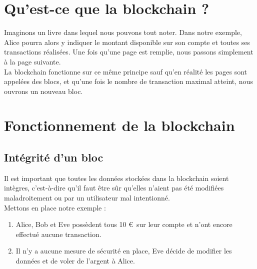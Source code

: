 \documentclass[12pt, a4paper, oneside]{book}
\begin{document}
    \section{Qu'est-ce que la blockchain ?}
    Imaginons un livre dans lequel nous pouvons tout noter. Dans notre exemple, Alice pourra alors y indiquer le montant disponible sur son compte et toutes ses transactions réalisées. Une fois qu’une page est remplie, nous passons simplement à la page suivante.
    \\
    La blockchain fonctionne sur ce même principe sauf qu’en réalité les pages sont appelées des blocs, et qu’une fois le nombre de transaction maximal atteint, nous ouvrons un nouveau bloc.

    \section{Fonctionnement de la blockchain}
    
    
    \subsection{Intégrité d'un bloc}
    Il est important que toutes les données stockées dans la blockchain soient intègres, c’est-à-dire qu’il faut être sûr qu’elles n’aient pas été modifiées maladroitement ou par un utilisateur mal intentionné.
    \\
    Mettons en place notre exemple :

    \begin{enumerate}
        \item Alice, Bob et Eve possèdent tous 10 \euro~sur leur compte et n’ont encore effectué aucune transaction.
        \item Il n'y a aucune mesure de sécurité en place, Eve décide de modifier les données et de voler de l’argent à Alice. 
        \newline
    \end{enumerate} 
\end{document}
